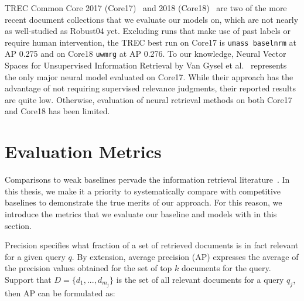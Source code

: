 TREC Common Core 2017 (Core17)~\cite{allan2017trec} and 2018 (Core18)~\cite{core2018trec} are two of the more recent document collections that we evaluate our models on, which are not nearly as well-studied as Robust04 yet.
Excluding runs that make use of past labels or require human intervention, the TREC best run on Core17 is \texttt{umass baselnrm} at AP 0.275 and on Core18 \texttt{uwmrg} at AP 0.276.
To our knowledge, Neural Vector Spaces for Unsupervised Information Retrieval by Van Gysel et al.~\cite{Gysel:2018:NVS:3211967.3196826} represents the only major neural model evaluated on Core17.
While their approach has the advantage of not requiring supervised relevance judgments, their reported results are quite low.
Otherwise, evaluation of neural retrieval methods on both Core17 and Core18 has been limited.

\section{Evaluation Metrics}

Comparisons to weak baselines pervade the information retrieval literature~\cite{Armstrong_etal_CIKM2009, lin2019neural}.
In this thesis, we make it a priority to systematically compare with competitive baselines to demonstrate the true merits of our approach.
For this reason, we introduce the metrics that we evaluate our baseline and models with in this section.



\smallskip {}

Precision specifies what fraction of a set of retrieved documents is in fact relevant for a given query $ q $.
By extension, average precision (AP) expresses the average of the precision values obtained for the set of top $ k $ documents for the query.
Support that $ D = \{d_1, ..., d_{m_j}\} $ is the set of all relevant documents for a query $ q_j $, then AP can be formulated as:

